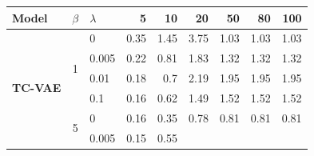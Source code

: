 \clearpage
\newpage
\begin{table}[htbp]
  \centering
    \begin{tabular}{|c|clrrrrrr|}
    \toprule
    \multicolumn{1}{l}{\textbf{Model}} &
      \multicolumn{1}{l}{\textbf{$\beta$}} &
      \multicolumn{1}{l}{\textbf{$\lambda$}} &
      \textbf{5} &
      \textbf{10} &
      \textbf{20} &
      \textbf{50} &
      \textbf{80} &
      \multicolumn{1}{r}{100}
      \\
    \midrule
    \multirow{12}[6]{*}{\textbf{TC-VAE}} &
      \multirow{4}[2]{*}{1} &
      0 &
      \cellcolor[rgb]{ .969,  .929,  .608}0.35 &
      \cellcolor[rgb]{ .78,  .871,  .569}1.45 &
      \cellcolor[rgb]{ .388,  .745,  .482}3.75 &
      \cellcolor[rgb]{ .855,  .894,  .584}1.03 &
      \cellcolor[rgb]{ .855,  .894,  .584}1.03 &
      \cellcolor[rgb]{ .855,  .894,  .584}1.03
      \\
     &
       &
      0.005 &
      \cellcolor[rgb]{ .992,  .937,  .612}0.22 &
      \cellcolor[rgb]{ .89,  .906,  .592}0.81 &
      \cellcolor[rgb]{ .718,  .851,  .553}1.83 &
      \cellcolor[rgb]{ .804,  .878,  .573}1.32 &
      \cellcolor[rgb]{ .804,  .878,  .573}1.32 &
      \cellcolor[rgb]{ .804,  .878,  .573}1.32
      \\
     &
       &
      0.01 &
      \cellcolor[rgb]{ 1,  .937,  .612}0.18 &
      \cellcolor[rgb]{ .91,  .91,  .596}0.7 &
      \cellcolor[rgb]{ .655,  .831,  .541}2.19 &
      \cellcolor[rgb]{ .698,  .843,  .549}1.95 &
      \cellcolor[rgb]{ .698,  .843,  .549}1.95 &
      \cellcolor[rgb]{ .698,  .843,  .549}1.95
      \\
     &
       &
      0.1 &
      \cellcolor[rgb]{ 1,  .937,  .612}0.16 &
      \cellcolor[rgb]{ .925,  .914,  .596}0.62 &
      \cellcolor[rgb]{ .776,  .867,  .565}1.49 &
      \cellcolor[rgb]{ .769,  .867,  .565}1.52 &
      \cellcolor[rgb]{ .769,  .867,  .565}1.52 &
      \cellcolor[rgb]{ .769,  .867,  .565}1.52
      \\
\cmidrule{2-9}     &
      \multirow{4}[2]{*}{5} &
      0 &
      \cellcolor[rgb]{ .992,  .937,  .612}0.16 &
      \cellcolor[rgb]{ .922,  .914,  .596}0.35 &
      \cellcolor[rgb]{ .761,  .863,  .561}0.78 &
      \cellcolor[rgb]{ .749,  .859,  .561}0.81 &
      \cellcolor[rgb]{ .749,  .859,  .561}0.81 &
      \cellcolor[rgb]{ .749,  .859,  .561}0.81
      \\
     &
       &
      0.005 &
      \cellcolor[rgb]{ .996,  .937,  .612}0.15 &
      \cellcolor[rgb]{ .847,  .89,  .58}0.55 &

\end{tabular}
\end{table}
